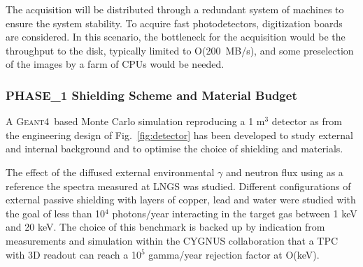 \documentclass[physics,article,submit,moreauthors,pdftex]{Definitions/mdpi}
\newcommand{\GEANT} {{\textsc{Geant4}}\xspace}
\begin{document}

The acquisition will be distributed through a redundant system of 
machines to ensure the system stability. To acquire fast photodetectors, digitization boards are considered. In this scenario, the bottleneck for the acquisition would be the throughput to the disk, typically limited to O(200~MB/s),
and some preselection of the images by a farm of CPUs would be needed. 


\subsubsection{PHASE\_1 Shielding Scheme and Material Budget}\label{sec:back}

A \GEANT~based Monte Carlo simulation reproducing a 1 m$^3$ detector as from the engineering design of Fig.~\ref{fig:detector} has been developed to study external and internal background and to optimise the choice of shielding and materials. 

The effect of the diffused external environmental $\gamma$ and neutron flux using as a reference the spectra measured at LNGS was studied. Different configurations of external passive shielding with layers of copper, lead and water were studied with the goal of less than 10$^4$ photons/year interacting in the target gas between 1 keV and 20 keV. The choice of this benchmark is backed up by indication from measurements\cite{Riffard:2016mgw,Phan:2015pda} and simulation within the CYGNUS collaboration\cite{Vahsen:2020pzb} that a TPC with 3D readout can reach a 10$^5$ gamma/year rejection factor at O(keV). 
\end{document}
